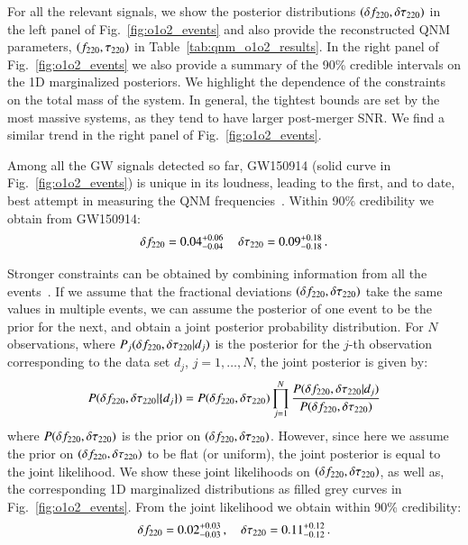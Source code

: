For all the relevant signals, we show the posterior distributions
$(\delta f_{\text{220}}, \delta \tau_{\text{220}})$ in the left panel of
Fig.~\ref{fig:o1o2_events} and also provide the reconstructed QNM
parameters, $(f_{\text{220}}, \tau_{\text{220}})$ in
Table~\ref{tab:qnm_o1o2_results}. In the right panel of
Fig.~\ref{fig:o1o2_events} we also provide a summary of the 90\%
credible intervals on the 1D marginalized posteriors. We highlight the
dependence of the constraints on the total mass of the
system. In general, the tightest bounds are set by the 
most massive systems, as they tend to have larger post-merger SNR. We
find a similar trend in the right panel of Fig.~\ref{fig:o1o2_events}.
 
Among all the GW signals detected so far, GW150914 (solid curve in
Fig.~\ref{fig:o1o2_events}) is unique in its loudness, leading to the
first, and to date, best attempt in measuring the QNM
frequencies~\cite{TheLIGOScientific:2016src,Brito:2018rfr,Carullo:2019flw,Isi:2019aib}. Within
90\% credibility we obtain from GW150914:
%
\begin{equation}\label{GW150914_delta}
\delta f_{\text{220}}=0.04^{+0.06}_{-0.04}\,\quad \delta \tau_{\text{220}}=0.09^{+0.18}_{-0.18}\,.
\end{equation}

Stronger constraints can be obtained by combining information from all the events~\cite{Abbott:2020jks}. If we assume that the fractional deviations $(\delta f_{\text{220}},\delta \tau_{\text{220}})$ take the same values in multiple events, we can assume
the posterior of one event to be the prior for the next, and obtain a
joint posterior probability distribution. For $N$ observations, where
$P_j(\delta f_{\text{220}}, \delta \tau_{\text{220}} | d_j)$ is the posterior for the $j$-th
observation corresponding to the data set $d_j$, $j=1,\dots,N$, the joint
posterior is given by:
%
\begin{equation}
P(\delta f_{\text{220}}, \delta \tau_{\text{220}} | \{d_j\}) = P(\delta f_{\text{220}}, \delta \tau_{\text{220}}) \prod _{j=1}^N \frac{P(\delta f_{\text{220}}, \delta \tau_{\text{220}} | d_j) }{P(\delta f_{\text{220}}, \delta \tau_{\text{220}})}
\end{equation}
%
where $P(\delta f_{\text{220}}, \delta \tau_{\text{220}})$ is the prior on $(\delta f_{\text{220}},
\delta \tau_{\text{220}})$. However, since here we assume the prior on $(\delta f_{\text{220}},
\delta \tau_{\text{220}})$ to be flat (or uniform), the joint posterior is equal to
the joint likelihood. We show these joint likelihoods on $(\delta f_{\text{220}}, \delta \tau_{\text{220}})$, as well as, the corresponding 1D marginalized distributions as filled grey curves in Fig.~\ref{fig:o1o2_events}. From the joint likelihood we obtain within 90\% credibility: 
%
\begin{equation}
\delta f_{\text{220}}=0.02^{+0.03}_{-0.03}\,,\quad \delta \tau_{\text{220}}=0.11^{+0.12}_{-0.12}\,.
\end{equation}
%

